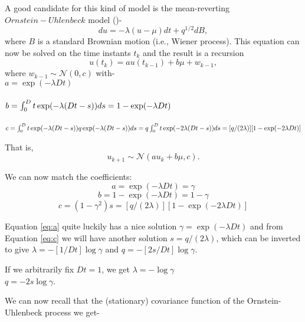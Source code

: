 A good candidate for this kind of model is the mean-reverting $Ornstein-Uhlenbeck$ model 
(\cite{Ornstein_Uhlenbeck:1930})-
\begin{equation}
du = -\lambda \left(u - \mu\right) dt + q^{1/2} dB,
\end{equation}
where $B$ is a standard Brownian motion (i.e., Wiener process). This equation can now be solved on the time instants $t_k$ and the result is a recursion
\begin{equation}
u(t_k) = a u(t_{k-1}) + b \mu + w_{k-1},
\end{equation}
where $w_{k-1} \sim \mathcal{N}(0,c)$ with-\\
$a = \exp(-\lambda Dt)$\\~\\
$b = \int_0^Dt \exp(-\lambda (Dt-s)) ds\\
 = 1 - \exp(-\lambda Dt)$\\~\\
$c = \int_0^Dt \exp(-\lambda (Dt-s)) q \exp(-\lambda (Dt-s)) ds \\
= q \int_0^Dt \exp(-2 \lambda (Dt-s)) ds\\
= [q / (2 \lambda)] [1 - \exp(-2 \lambda Dt)]$

That is,
\begin{equation}
u_{k+1} \sim \mathcal{N}\left(a u_k + b \mu, c\right).
\end{equation}

We can now match the coefficients:
\begin{equation} \label{eq:a}
a = \exp(-\lambda Dt) = \gamma
\end{equation}
\begin{equation} \label{eq:b}
b = 1 - \exp(-\lambda Dt) = 1 - \gamma
\end{equation}
\begin{equation} \label{eq:c}
c = (1 - \gamma^2) s = [q / (2 \lambda)] [1 - \exp(-2 \lambda Dt)]
\end{equation}

Equation \ref{eq:a} quite luckily has a nice solution 
$\gamma = \exp(-\lambda Dt)$ and from Equation \ref{eq:c} we will have another solution
$s = q / (2 \lambda)$,
which can be inverted to give
$\lambda = -[1 / Dt] \log \gamma$ and
$q = -[2 s / Dt] \log \gamma$. 

If we arbitrarily fix $Dt = 1$, we get
$\lambda = -\log \gamma$\\
$q = -2 s \log \gamma$.

We can now recall that the (stationary) covariance function of the Ornstein-Uhlenbeck process we get-

